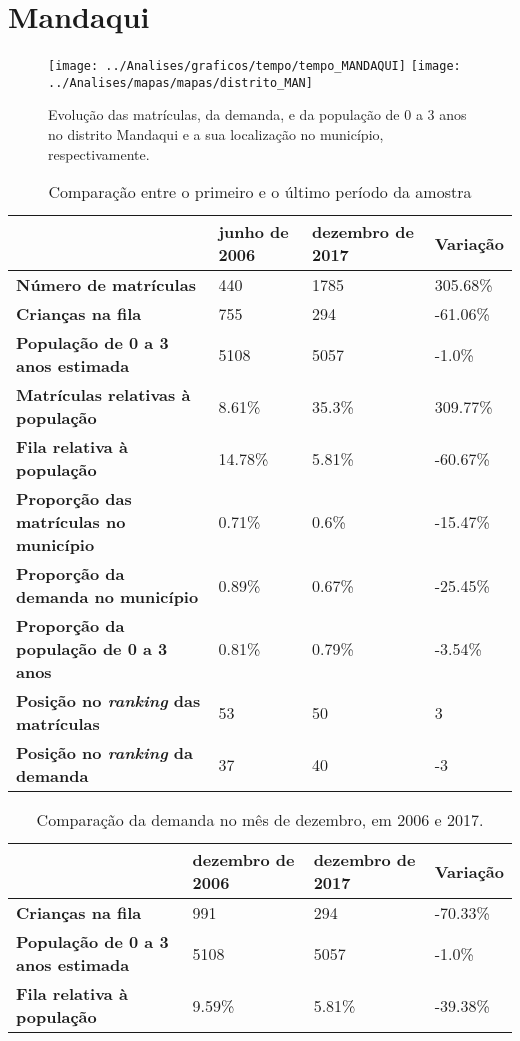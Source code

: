 \section{Mandaqui}
\begin{figure}[H]
	\centering
	\texttt{[image: ../Analises/graficos/tempo/tempo\_MANDAQUI]}
	\texttt{[image: ../Analises/mapas/mapas/distrito\_MAN]}
	\caption{Evolução das matrículas, da demanda, e da população de 0 a 3 anos no distrito Mandaqui e a sua localização no município, respectivamente.}
\end{figure}
\begin{table}[H]
	\begin{tabular}{|l|l|l|l|}
		\hline
		\textbf{}                                      & \textbf{junho de 2006}       & \textbf{dezembro de 2017}    & \textbf{Variação} \\ \hline
		\textbf{Número de matrículas}                  & 440 & 1785 & 305.68\% \\ \hline
		\textbf{Crianças na fila}                      & 755 & 294 & -61.06\% \\ \hline
		\textbf{População de 0 a 3 anos estimada}      & 5108 & 5057 & -1.0\% \\ \hline
		\textbf{Matrículas relativas à população}      & 8.61\% & 35.3\% & 309.77\% \\ \hline
		\textbf{Fila relativa à população}             & 14.78\% & 5.81\% & -60.67\% \\ \hline
		\textbf{Proporção das matrículas no município} & 0.71\% & 0.6\% & -15.47\% \\ \hline
		\textbf{Proporção da demanda no município}     & 0.89\% & 0.67\% & -25.45\% \\ \hline
		\textbf{Proporção da população de 0 a 3 anos}  & 0.81\% & 0.79\% & -3.54\% \\ \hline
		\textbf{Posição no \textit{ranking} das matrículas}     & 53 & 50 & 3 \\ \hline
		\textbf{Posição no \textit{ranking} da demanda}         & 37 & 40 & -3 \\ \hline
	\end{tabular}
	\caption{Comparação entre o primeiro e o último período da amostra}
\end{table}
\begin{table}[H]
	\begin{tabular}{|l|l|l|l|}
		\hline
		\textbf{}                                 & \textbf{dezembro de 2006} & \textbf{dezembro de 2017} & \textbf{Variação} \\ \hline
		\textbf{Crianças na fila}                      & 991 & 294 & -70.33\% \\ \hline
		\textbf{População de 0 a 3 anos estimada}      & 5108 & 5057 & -1.0\% \\ \hline
		\textbf{Fila relativa à população}             & 9.59\% & 5.81\% & -39.38\% \\ \hline
	\end{tabular}
	\caption{Comparação da demanda no mês de dezembro, em 2006 e 2017.}
\end{table}
